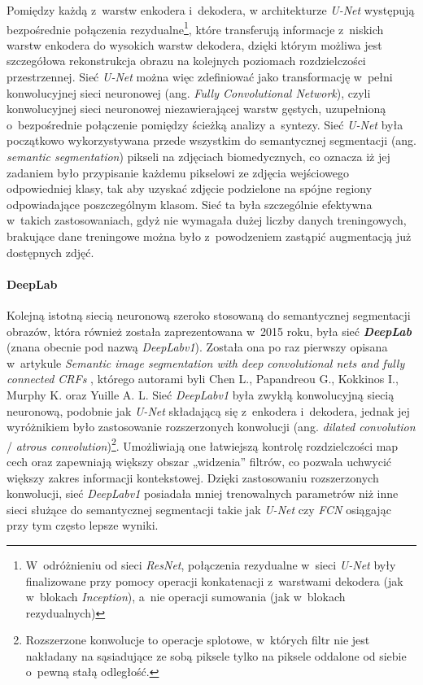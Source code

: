 Pomiędzy każdą z~warstw enkodera i~dekodera, w architekturze \emph{U-Net} występują bezpośrednie połączenia rezydualne\footnote{W~odróżnieniu od sieci \emph{ResNet}, połączenia rezydualne w~sieci \emph{U-Net} były finalizowane przy pomocy operacji konkatenacji z~warstwami dekodera (jak w~blokach \emph{Inception}), a~nie operacji sumowania (jak w~blokach rezydualnych)}, które transferują informacje z~niskich warstw enkodera do wysokich warstw dekodera, dzięki którym możliwa jest szczegółowa rekonstrukcja obrazu na kolejnych poziomach rozdzielczości przestrzennej. Sieć \emph{U-Net} można więc zdefiniować jako transformację w~pełni konwolucyjnej sieci neuronowej (ang. \emph{Fully Convolutional Network}), czyli konwolucyjnej sieci neuronowej niezawierającej warstw gęstych, uzupełnioną o~bezpośrednie połączenie pomiędzy ścieżką analizy a~syntezy. Sieć \emph{U-Net} była początkowo wykorzystywana przede wszystkim do semantycznej segmentacji (ang. \emph{semantic segmentation}) pikseli na zdjęciach biomedycznych, co oznacza iż jej zadaniem było przypisanie każdemu pikselowi ze zdjęcia wejściowego odpowiedniej klasy, tak aby uzyskać zdjęcie podzielone na spójne regiony odpowiadające poszczególnym klasom. Sieć ta była szczególnie efektywna w~takich zastosowaniach, gdyż nie wymagała dużej liczby danych treningowych, brakujące dane treningowe można było z~powodzeniem zastąpić augmentacją już dostępnych zdjęć. 

\paragraph*{DeepLab}

Kolejną istotną siecią neuronową szeroko stosowaną do semantycznej segmentacji obrazów, która również została zaprezentowana w~2015 roku, była sieć \textbf{\emph{DeepLab}} (znana obecnie pod nazwą \emph{DeepLabv1}). Została ona po raz pierwszy opisana w~artykule \emph{Semantic image segmentation with deep convolutional nets and fully connected CRFs} \cite{chen}, którego autorami byli Chen L., Papandreou G., Kokkinos I., Murphy K. oraz Yuille A. L. Sieć \emph{DeepLabv1} była zwykłą konwolucyjną siecią neuronową, podobnie jak \emph{U-Net} składającą się z~enkodera i~dekodera, jednak jej wyróżnikiem było zastosowanie rozszerzonych konwolucji (ang. \emph{dilated convolution} / \emph{atrous convolution})\footnote{Rozszerzone konwolucje to operacje splotowe, w~których filtr nie jest nakładany na sąsiadujące ze sobą piksele tylko na piksele oddalone od siebie o~pewną stałą odległość.}. Umożliwiają one łatwiejszą kontrolę rozdzielczości map cech oraz zapewniają większy obszar „widzenia” filtrów, co pozwala uchwycić większy zakres informacji kontekstowej. Dzięki zastosowaniu rozszerzonych konwolucji, sieć \emph{DeepLabv1} posiadała mniej trenowalnych parametrów niż inne sieci służące do semantycznej segmentacji takie jak \emph{U-Net} czy \emph{FCN} osiągając przy tym często lepsze wyniki.

